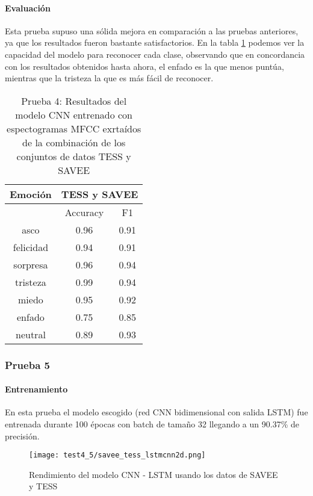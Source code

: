 \documentclass[11pt,a4paper,spanish]{book}
\begin{document}
	\paragraph{Evaluación}
	Esta prueba supuso una sólida mejora en comparación a las pruebas anteriores, ya que los resultados fueron bastante satisfactorios. En la tabla \ref{result_Test4} podemos ver la capacidad del modelo para reconocer cada clase, observando que en concordancia con los resultados obtenidos hasta ahora, el enfado es la que menos puntúa, mientras que la tristeza la que es más fácil de reconocer.
	\begin{table}[H]
		\centering
		\begin{center}
			\begin{tabular}{| c|| c c | }
				\hline
				\multicolumn{1}{|c||}{Emoción} & 
				\multicolumn{2}{|c|}{TESS y SAVEE} \\
				\hline
				& 
				\multicolumn{1}{|c|}{Accuracy}&\multicolumn{1}{|c|}{F1}\\
				\hline
				asco 		&  0.96 &  0.91 \\
				felicidad 	&  0.94 &  0.91 \\
				sorpresa 	&  0.96 &  0.94 \\
				tristeza 	&  0.99 &  0.94 \\
				miedo 		&  0.95 &  0.92 \\
				enfado 		&  0.75 &  0.85 \\
				neutral 	&  0.89 &  0.93 \\
				\hline
			\end{tabular}
			
			\caption{Prueba 4: Resultados del modelo CNN entrenado con espectogramas MFCC exrtaídos de la combinación de los conjuntos de datos TESS y SAVEE}
			\label{result_Test4}
		\end{center}
	\end{table}
	
	\subsubsection{Prueba 5}
	\paragraph{Entrenamiento}
	En esta prueba el modelo escogido (red CNN bidimensional con salida LSTM) fue entrenada durante 100 épocas con batch de tamaño 32 llegando a un 90.37\% de precisión. 
	\begin{figure}[H]
		\centering
		\texttt{[image: test4\_5/savee\_tess\_lstmcnn2d.png]} 
		\caption{Rendimiento del modelo CNN - LSTM usando los datos de SAVEE y TESS}
		\label{fig:lstm-cnn}
	\end{figure}
\end{document}
